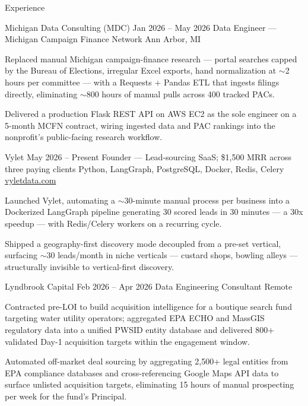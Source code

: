\documentclass[
	11pt
]{../../../template}
\begin{document}
	\begin{rSection}{E}{xperience}
		\begin{rSectionEntry}
			{Michigan Data Consulting (MDC)}
			{Jan 2026 -- May 2026}
			{Data Engineer --- Michigan Campaign Finance Network}
			{}
			{Ann Arbor, MI}

			\item Replaced manual Michigan campaign-finance research — portal searches capped by the Bureau of Elections, irregular Excel exports, hand normalization at $\sim$2 hours per committee — with a Requests + Pandas ETL that ingests filings directly, eliminating $\sim$800 hours of manual pulls across 400 tracked PACs.
			\item Delivered a production Flask REST API on AWS EC2 as the sole engineer on a 5-month MCFN contract, wiring ingested data and PAC rankings into the nonprofit's public-facing research workflow.
		\end{rSectionEntry}

		\begin{rSectionEntry}
			{Vylet}
			{May 2026 -- Present}
			{Founder --- Lead-sourcing SaaS; \$1,500 MRR across three paying clients}
			{Python, LangGraph, PostgreSQL, Docker, Redis, Celery}
			{\href{https://vyletdata.com}{vyletdata.com}}

			\item Launched Vylet, automating a $\sim$30-minute manual process per business into a Dockerized LangGraph pipeline generating 30 scored leads in 30 minutes --- a 30x speedup --- with Redis/Celery workers on a recurring cycle.
			\item Shipped a geography-first discovery mode decoupled from a pre-set vertical, surfacing $\sim$30 leads/month in niche verticals — custard shops, bowling alleys — structurally invisible to vertical-first discovery.
		\end{rSectionEntry}

		\begin{rSectionEntry}
			{Lyndbrook Capital}
			{Feb 2026 -- Apr 2026}
			{Data Engineering Consultant}
			{}
			{Remote}

			\item Contracted pre-LOI to build acquisition intelligence for a boutique search fund targeting water utility operators; aggregated EPA ECHO and MassGIS regulatory data into a unified PWSID entity database and delivered 800+ validated Day-1 acquisition targets within the engagement window.
			\item Automated off-market deal sourcing by aggregating 2,500+ legal entities from EPA compliance databases and cross-referencing Google Maps API data to surface unlisted acquisition targets, eliminating 15 hours of manual prospecting per week for the fund's Principal.
		\end{rSectionEntry}
	\end{rSection}
\end{document}
